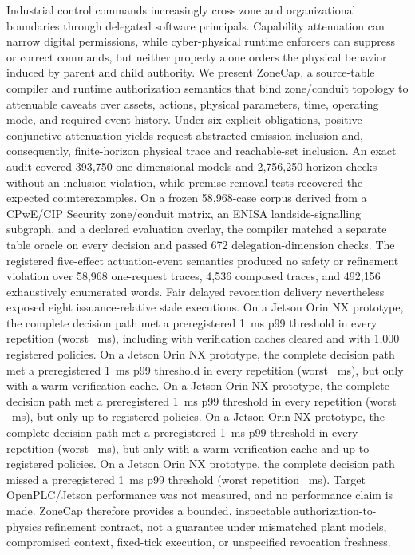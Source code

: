 Industrial control commands increasingly cross zone and organizational boundaries through delegated software principals. Capability attenuation can narrow digital permissions, while cyber-physical runtime enforcers can suppress or correct commands, but neither property alone orders the physical behavior induced by parent and child authority. We present ZoneCap, a source-table compiler and runtime authorization semantics that bind zone/conduit topology to attenuable caveats over assets, actions, physical parameters, time, operating mode, and required event history. Under six explicit obligations, positive conjunctive attenuation yields request-abstracted emission inclusion and, consequently, finite-horizon physical trace and reachable-set inclusion. An exact audit covered 393,750 one-dimensional models and 2,756,250 horizon checks without an inclusion violation, while premise-removal tests recovered the expected counterexamples. On a frozen 58,968-case corpus derived from a CPwE/CIP Security zone/conduit matrix, an ENISA landside-signalling subgraph, and a declared evaluation overlay, the compiler matched a separate table oracle on every decision and passed 672 delegation-dimension checks. The registered five-effect actuation-event semantics produced no safety or refinement violation over 58,968 one-request traces, 4,536 composed traces, and 492,156 exhaustively enumerated words. Fair delayed revocation delivery nevertheless exposed eight issuance-relative stale executions. \ifzonecaphardware\ifcase\cfiveoutcomecase
On a Jetson Orin NX prototype, the complete decision path met a preregistered 1~ms p99 threshold in every repetition (worst ~ms), including with verification caches cleared and with 1,000 registered policies.
\or
On a Jetson Orin NX prototype, the complete decision path met a preregistered 1~ms p99 threshold in every repetition (worst ~ms), but only with a warm verification cache.
\or
On a Jetson Orin NX prototype, the complete decision path met a preregistered 1~ms p99 threshold in every repetition (worst ~ms), but only up to  registered policies.
\or
On a Jetson Orin NX prototype, the complete decision path met a preregistered 1~ms p99 threshold in every repetition (worst ~ms), but only with a warm verification cache and up to  registered policies.
\or
On a Jetson Orin NX prototype, the complete decision path missed a preregistered 1~ms p99 threshold (worst repetition ~ms).
\fi\else
Target OpenPLC/Jetson performance was not measured, and no performance claim is made.
\fi ZoneCap therefore provides a bounded, inspectable authorization-to-physics refinement contract, not a guarantee under mismatched plant models, compromised context, fixed-tick execution, or unspecified revocation freshness.

